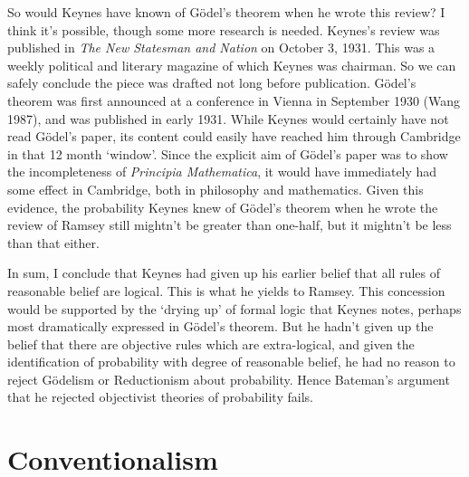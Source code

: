 \documentclass[noflushend]{philosophersimprint}
\begin{document}
So would Keynes have known of Gödel's theorem when he wrote this review?
I think it's possible, though some more research is needed. Keynes's
review was published in \emph{The New Statesman and Nation} on October
3, 1931. This was a weekly political and literary magazine of which
Keynes was chairman. So we can safely conclude the piece was drafted not
long before publication. Gödel's theorem was first announced at a
conference in Vienna in September 1930 (Wang 1987), and was published in
early 1931. While Keynes would certainly have not read Gödel's paper,
its content could easily have reached him through Cambridge in that 12
month `window'. Since the explicit aim of Gödel's paper was to show the
incompleteness of \emph{Principia Mathematica}, it would have
immediately had some effect in Cambridge, both in philosophy and
mathematics. Given this evidence, the probability Keynes knew of Gödel's
theorem when he wrote the review of Ramsey still mightn't be greater
than one-half, but it mightn't be less than that either.

In sum, I conclude that Keynes had given up his earlier belief that all
rules of reasonable belief are logical. This is what he yields to
Ramsey. This concession would be supported by the `drying up' of formal
logic that Keynes notes, perhaps most dramatically expressed in Gödel's
theorem. But he hadn't given up the belief that there are objective
rules which are extra-logical, and given the identification of
probability with degree of reasonable belief, he had no reason to reject
Gödelism or Reductionism about probability. Hence Bateman's argument
that he rejected objectivist theories of probability fails.

\hypertarget{conventionalism}{%
\section{Conventionalism}\label{conventionalism}}
\end{document}
